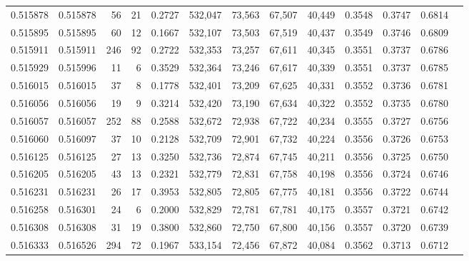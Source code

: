 \begin{tabular}{rrrrrrrrrrrrr}
0.515878 & 0.515878 &    56 &    21 &                                     0.2727 & 532,047 &  73,563 &  67,507 &  40,449 & 0.3548 & 0.3747 & 0.6814 \\
0.515895 & 0.515895 &    60 &    12 &                                     0.1667 & 532,107 &  73,503 &  67,519 &  40,437 & 0.3549 & 0.3746 & 0.6809 \\
0.515911 & 0.515911 &   246 &    92 &                                     0.2722 & 532,353 &  73,257 &  67,611 &  40,345 & 0.3551 & 0.3737 & 0.6786 \\
0.515929 & 0.515996 &    11 &     6 &                                     0.3529 & 532,364 &  73,246 &  67,617 &  40,339 & 0.3551 & 0.3737 & 0.6785 \\
0.516015 & 0.516015 &    37 &     8 &                                     0.1778 & 532,401 &  73,209 &  67,625 &  40,331 & 0.3552 & 0.3736 & 0.6781 \\
0.516056 & 0.516056 &    19 &     9 &                                     0.3214 & 532,420 &  73,190 &  67,634 &  40,322 & 0.3552 & 0.3735 & 0.6780 \\
0.516057 & 0.516057 &   252 &    88 &                                     0.2588 & 532,672 &  72,938 &  67,722 &  40,234 & 0.3555 & 0.3727 & 0.6756 \\
0.516060 & 0.516097 &    37 &    10 &                                     0.2128 & 532,709 &  72,901 &  67,732 &  40,224 & 0.3556 & 0.3726 & 0.6753 \\
0.516125 & 0.516125 &    27 &    13 &                                     0.3250 & 532,736 &  72,874 &  67,745 &  40,211 & 0.3556 & 0.3725 & 0.6750 \\
0.516205 & 0.516205 &    43 &    13 &                                     0.2321 & 532,779 &  72,831 &  67,758 &  40,198 & 0.3556 & 0.3724 & 0.6746 \\
0.516231 & 0.516231 &    26 &    17 &                                     0.3953 & 532,805 &  72,805 &  67,775 &  40,181 & 0.3556 & 0.3722 & 0.6744 \\
0.516258 & 0.516301 &    24 &     6 &                                     0.2000 & 532,829 &  72,781 &  67,781 &  40,175 & 0.3557 & 0.3721 & 0.6742 \\
0.516308 & 0.516308 &    31 &    19 &                                     0.3800 & 532,860 &  72,750 &  67,800 &  40,156 & 0.3557 & 0.3720 & 0.6739 \\
0.516333 & 0.516526 &   294 &    72 &                                     0.1967 & 533,154 &  72,456 &  67,872 &  40,084 & 0.3562 & 0.3713 & 0.6712 \\

\end{tabular}
